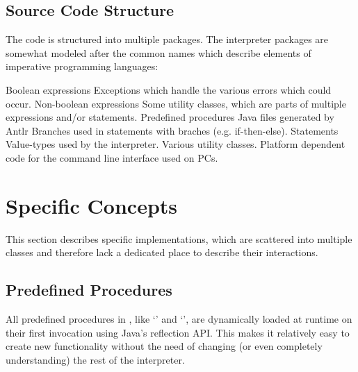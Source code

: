 \subsection{Source Code Structure}\label{srcStructure}

The code is structured into multiple packages. The interpreter packages are somewhat modeled after the common names which describe elements of imperative programming languages:

\begin{itemize}
            {Boolean expressions}
            {Exceptions which handle the various errors which could occur.}
            {Non-boolean expressions}
            {Some utility classes, which are parts of multiple expressions and\slash{}or statements.}
            {Predefined procedures}
            {Java files generated by Antlr}
            {Branches used in statements with braches (e.g. if-then-else).}
            {Statements}
            {Value-types used by the interpreter.}
            {Various utility classes.}
            {Platform dependent code for the command line interface used on PCs.}
\end{itemize}

\section{Specific Concepts}\label{specificConcepts}

This section describes specific implementations, which are scattered into multiple classes and therefore lack a dedicated place to describe their interactions.

\subsection{Predefined Procedures}

All predefined procedures in \setlX{}, like `' and `', are dynamically loaded at runtime on their first invocation using Java's reflection API. This makes it relatively easy to create new functionality without the need of changing (or even completely understanding) the rest of the interpreter.

